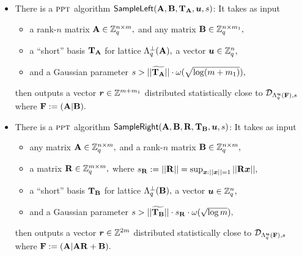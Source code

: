 \begin{lemma}
\begin{itemize}
 \item There is a $\textsc{ppt}$ algorithm $\mathsf{SampleLeft}(\mathbf{A}, \mathbf{B}, \mathbf{T}_{\mathbf{A}}, \boldsymbol{u}, s)$: It takes as input
\begin{itemize}
\item a rank-$n$ matrix $\mathbf{A}\in\mathbb{Z}_q^{n\times m},$ and any matrix $\mathbf{B}\in\mathbb{Z}_q^{n\times m_1},$
\item a ``short'' basis $\mathbf{T}_{\mathbf{A}}$ for lattice $\Lambda_q^{\bot}(\mathbf{A}),$ a vector $\boldsymbol{u}\in\mathbb{Z}_q^n,$
\item and a Gaussian parameter $s > ||\widetilde{\mathbf{T}_{\mathbf{A}}}||\cdot\omega(\sqrt{\log(m+m_1)}),$
\end{itemize}
then outputs a vector $\boldsymbol{r}\in\mathbb{Z}^{m+m_1}$ distributed statistically close to $\mathcal{D}_{\Lambda_q^{\boldsymbol{u}}(\mathbf{F}), s}$ where $\mathbf{F}:=(\mathbf{A}|\mathbf{B}).$

 \item There is a $\textsc{ppt}$ algorithm $\mathsf{SampleRight}(\mathbf{A}, \mathbf{B}, \mathbf{R}, \mathbf{T}_{\mathbf{B}}, \boldsymbol{u}, s)$: It takes as input
\begin{itemize}
\item any matrix $\mathbf{A}\in\mathbb{Z}_q^{n \times m},$ and a rank-$n$ matrix $\mathbf{B}\in\mathbb{Z}_q^{n\times m},$
\item a matrix $\mathbf{R}\in\mathbb{Z}_q^{m \times m},$ where $s_{\mathbf{R}} := ||\mathbf{R}|| = \sup_{\boldsymbol{x} : ||\boldsymbol{x}||=1}||\mathbf{R}\boldsymbol{x}||,$
\item a ``short'' basis $\mathbf{T}_{\mathbf{B}}$ for lattice $\Lambda_q^{\bot}(\mathbf{B}),$ a vector $\boldsymbol{u}\in\mathbb{Z}_q^n,$
\item and a Gaussian parameter $s > ||\widetilde{\mathbf{T}_{\mathbf{B}}}||\cdot{s_{\mathbf{R}}}\cdot\omega(\sqrt{\log{m}}),$
\end{itemize}
then outputs a vector $\boldsymbol{r}\in\mathbb{Z}^{2m}$ distributed statistically close to $\mathcal{D}_{\Lambda_q^{\boldsymbol{u}}(\mathbf{F}), s}$ where $\mathbf{F}:=(\mathbf{A}|\mathbf{A}\mathbf{R} + \mathbf{B}).$


\end{itemize}
\end{lemma} 